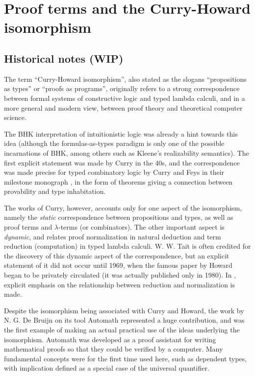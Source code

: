 \section{Proof terms and the Curry-Howard isomorphism}

\subsection{Historical notes (WIP)}

The term ``Curry-Howard isomorphism'', also stated as the slogans ``propositions
as types'' or ``proofs as programs'', originally refers to a strong
correspondence between formal systems of constructive logic and typed lambda
calculi, and in a more general and modern view, between proof theory and
theoretical computer science.

The BHK interpretation of intuitionistic logic was already a hint towards this
idea (although the formulas-as-types paradigm is only one of the possible
incarnations of BHK, among others such as Kleene's realizability semantics).
The first explicit statement was made by Curry in the 40s, and the
correspondence was made precise for typed combinatory logic by Curry and Feys in
their milestone monograph \cite{curry1958combinatory}, in the form of theorems
giving a connection between provability and type inhabitation.

The works of Curry, however, accounts only for one aspect of the isomorphism,
namely the \emph{static} correspondence between propositions and types, as well
as proof terms and $\lambda$-terms (or combinators). The other important aspect
is \emph{dynamic}, and relates proof normalization in natural deduction and term
reduction (computation) in typed lambda calculi. W. W. Tait is often credited
for the discovery of this dynamic aspect of the correspondence, but an explicit
statement of it did not occur until 1969, when the famous paper by Howard began
to be privately circulated (it was actually published only in 1980). In
\cite{howard:tfatnoc}, explicit emphasis on the relationship between reduction
and normalization is made.

Despite the isomorphism being associated with Curry and Howard, the work by
N. G. De Bruijn on its tool Automath \cite{aut-001-1} represented a huge
contribution, and was the first example of making an actual practical use of the
ideas underlying the isomorphism. Automath was developed as a proof assistant
for writing mathematical proofs so that they could be verified by a
computer. Many fundamental concepts were for the first time used here, such as
dependent types, with implication defined as a special case of the universal
quantifier.

